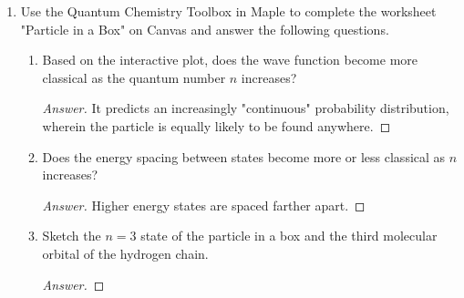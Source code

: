 \documentclass[../psets.tex]{subfiles}
\begin{document}
\begin{enumerate}
\begin{enumerate}
        \item When $E=\SI{8}{\electronvolt}$.
        \begin{proof}[Answer]
            We have that
            \begin{align*}
                \alpha &= \frac{\sqrt{2m\cdot 8}}{\hbar}&
                    \beta &= \frac{\sqrt{2m\cdot 0}}{\hbar}\\
                &= \frac{4}{\hbar}\sqrt{m}&
                    &= 0
            \end{align*}
            Thus, we have that
            \begin{align*}
                R &= \frac{(\alpha-\beta)^2}{(\alpha+\beta)^2}&
                    T &= \frac{4\alpha\beta}{(\alpha+\beta)^2}\\
                &= \frac{\left( \frac{4}{\hbar}\sqrt{m}-0 \right)^2}{\left( \frac{4}{\hbar}\sqrt{m}+0 \right)^2}&
                    &= \frac{4\cdot\frac{4}{\hbar}\sqrt{m}\cdot 0}{\left( \frac{4}{\hbar}\sqrt{m}+0 \right)^2}\\
                \Aboxed{R &= 1}&
                    \Aboxed{T &= 0}
            \end{align*}
        \end{proof}
    \end{enumerate}
    \item Use the Quantum Chemistry Toolbox in Maple to complete the worksheet "Particle in a Box" on Canvas and answer the following questions.
    \begin{enumerate}
        \item Based on the interactive plot, does the wave function become more classical as the quantum number $n$ increases?
        \begin{proof}[Answer]
             It predicts an increasingly "continuous" probability distribution, wherein the particle is equally likely to be found anywhere.
        \end{proof}
        \item Does the energy spacing between states become more or less classical as $n$ increases?
        \begin{proof}[Answer]
             Higher energy states are spaced farther apart.
        \end{proof}
        \item Sketch the $n=3$ state of the particle in a box and the third molecular orbital of the hydrogen chain.
        \begin{proof}[Answer]

\end{proof}
\end{enumerate}
\end{enumerate}
\end{document}

